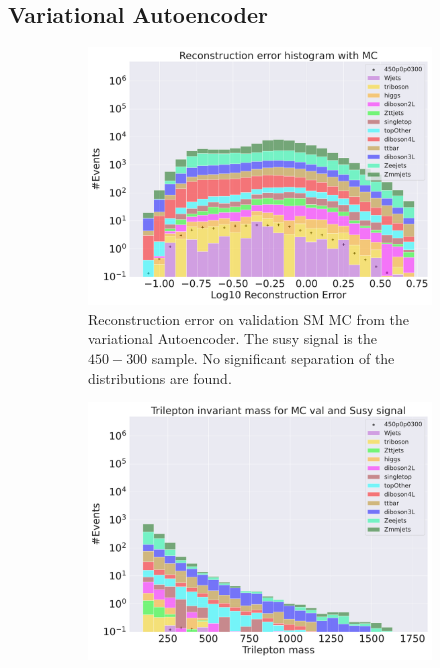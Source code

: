 \subsection*{Variational Autoencoder}

\begin{figure}[h!]
    \centering
    \begin{subfigure}{.8\textwidth}
        \includegraphics[width=\textwidth]{Figures/VAE_testing/small/b_data_recon_big_rm3_feats_sig_450p0p0300.pdf}
        \caption{Reconstruction error on validation SM MC from the variational Autoencoder. The susy signal is the $450-300$ sample. 
        No significant separation of the distributions are found. }
        \label{fig:vae_susy_450_300_recon}
    \end{subfigure}
    \hfill
    \begin{subfigure}{.8\textwidth}
        \includegraphics[width=\textwidth]{Figures/VAE_testing/small/b_data_recon_big_rm3_feats_sig_450p0p0300_Trilepton mass.pdf}

\end{subfigure}
\end{figure}
